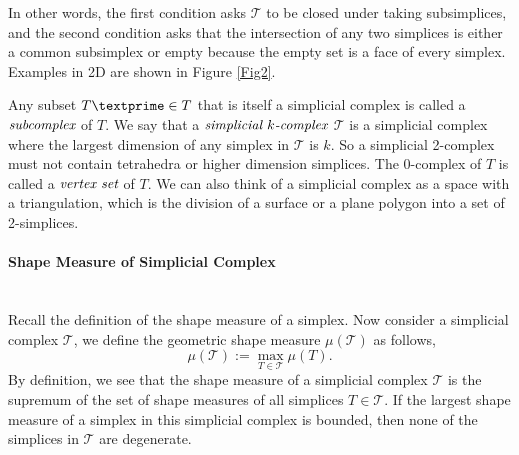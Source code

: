     In other words, the first condition asks $\mathcal{T}$ to be closed under taking subsimplices, and the second condition asks that the intersection of any two simplices is either a common subsimplex or empty because the empty set is a face of every simplex. Examples in 2D are shown in Figure \ref{Fig2}. 

    Any subset ${T\textprime}\in{T}$ that is itself a simplicial complex is called a $\emph{subcomplex}$ of ${T}$. We say that a $\emph{simplicial $k$-complex}$ $\mathcal T$ is a simplicial complex where the largest dimension of any simplex in $\mathcal T$ is ${k}$. So a simplicial 2-complex must not contain tetrahedra or higher dimension simplices. The 0-complex of ${T}$ is called a $\emph{vertex set}$ of ${T}$. We can also think of a simplicial complex as a space with a triangulation, which is the division of a surface or a plane polygon into a set of 2-simplices. 


    \paragraph{Shape Measure of Simplicial Complex}\mbox{}\\
    Recall the definition of the shape measure of a simplex.
    Now consider a simplicial complex $\mathcal{T}$, we define the geometric shape measure $\mu(\mathcal{T})$ as follows,
    \begin{equation*}
    \mu(\mathcal{T}) := \max_{T \in \mathcal{T}} \mu(T).
    \end{equation*}
    By definition, we see that the shape measure of a simplicial complex $\mathcal{T}$ is the supremum of the set of shape measures of all simplices $T\in\mathcal{T}$. If the largest shape measure of a simplex in this simplicial complex is bounded, then none of the simplices in $\mathcal{T}$ are degenerate. %
